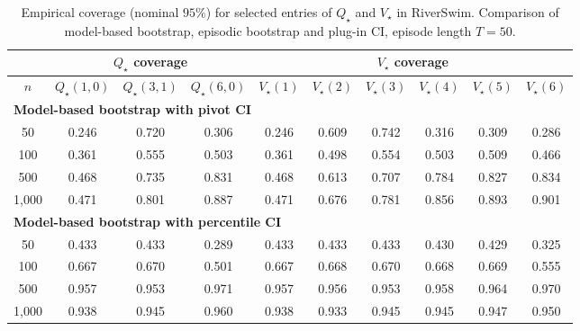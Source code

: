 \documentclass{article}
\numberwithin{equation}{section}
\begin{document}
\begin{table}[ht]
\centering
\caption{Empirical coverage (nominal $95\%$) for selected entries of $Q_\star$ and $V_\star$ in RiverSwim. Comparison of model-based bootstrap, episodic bootstrap and plug-in CI, episode length $T=50$.}
\label{tab:riverswim-optimal-coverage}
\begin{tabular}{c|ccc|cccccc}
\hline
& \multicolumn{3}{c|}{$Q_\star$ coverage} & \multicolumn{6}{c}{$V_\star$ coverage} \\ \hline
$n$
& $Q_\star(1,0)$ & $Q_\star(3,1)$ & $Q_\star(6,0)$
& $V_\star(1)$ & $V_\star(2)$ & $V_\star(3)$ & $V_\star(4)$ & $V_\star(5)$ & $V_\star(6)$ \\
\hline
\multicolumn{10}{l}{\textbf{Model-based bootstrap with pivot CI}} \\ \hline
50
& 0.246 & 0.720 & 0.306
& 0.246 & 0.609 & 0.742 & 0.316 & 0.309 & 0.286 \\
100
& 0.361 & 0.555 & 0.503
& 0.361 & 0.498 & 0.554 & 0.503 & 0.509 & 0.466 \\
500
& 0.468 & 0.735 & \cellcolor{covheat!40!white}0.831
& 0.468 & 0.613 & 0.707 & \cellcolor{covheat!17!white}0.784 & \cellcolor{covheat!38!white}0.827 & \cellcolor{covheat!42!white}0.834 \\
1{,}000
& 0.471 & \cellcolor{covheat!26!white}0.801 & \cellcolor{covheat!69!white}0.887
& 0.471 & 0.676 & \cellcolor{covheat!16!white}0.781 & \cellcolor{covheat!53!white}0.856 & \cellcolor{covheat!72!white}0.893 & \cellcolor{covheat!76!white}0.901 \\
\hline
\multicolumn{10}{l}{\textbf{Model-based bootstrap with percentile CI}} \\ \hline
50
& 0.433 & 0.433 & 0.289
& 0.433 & 0.433 & 0.433 & 0.430 & 0.429 & 0.325 \\
100
& 0.667 & 0.670 & 0.501
& 0.667 & 0.668 & 0.670 & 0.668 & 0.669 & 0.555 \\
500
& \cellcolor{covheat!100!white}0.957 & \cellcolor{covheat!100!white}0.953 & \cellcolor{covheat!100!white}0.971
& \cellcolor{covheat!100!white}0.957 & \cellcolor{covheat!100!white}0.956 & \cellcolor{covheat!100!white}0.953 & \cellcolor{covheat!100!white}0.958 & \cellcolor{covheat!100!white}0.964 & \cellcolor{covheat!100!white}0.970 \\
1{,}000
& \cellcolor{covheat!94!white}0.938 & \cellcolor{covheat!98!white}0.945 & \cellcolor{covheat!100!white}0.960
& \cellcolor{covheat!94!white}0.938 & \cellcolor{covheat!92!white}0.933 & \cellcolor{covheat!98!white}0.945 & \cellcolor{covheat!98!white}0.945 & \cellcolor{covheat!98!white}0.947 & \cellcolor{covheat!100!white}0.950 \\

\end{tabular}
\end{table}
\end{document}
